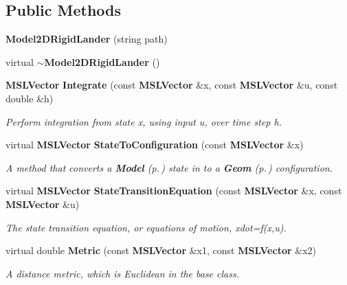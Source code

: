 \subsection*{Public Methods}
\begin{CompactItemize}
\item 
{\bf Model2DRigid\-Lander} (string path)
\item 
virtual {\bf $\sim$Model2DRigid\-Lander} ()
\item 
{\bf MSLVector} {\bf Integrate} (const {\bf MSLVector} \&x, const {\bf MSLVector} \&u, const double \&h)
\begin{CompactList}\small\item\em Perform integration from state x, using input u, over time step h.\item\end{CompactList}\item 
virtual {\bf MSLVector} {\bf State\-To\-Configuration} (const {\bf MSLVector} \&x)
\begin{CompactList}\small\item\em A method that converts a {\bf Model} {\rm (p.\,\pageref{classModel})} state in to a {\bf Geom} {\rm (p.\,\pageref{classGeom})} configuration.\item\end{CompactList}\item 
virtual {\bf MSLVector} {\bf State\-Transition\-Equation} (const {\bf MSLVector} \&x, const {\bf MSLVector} \&u)
\begin{CompactList}\small\item\em The state transition equation, or equations of motion, xdot=f(x,u).\item\end{CompactList}\item 
virtual double {\bf Metric} (const {\bf MSLVector} \&x1, const {\bf MSLVector} \&x2)
\begin{CompactList}\small\item\em A distance metric, which is Euclidean in the base class.\item\end{CompactList}\end{CompactItemize}
